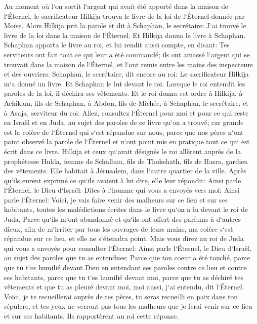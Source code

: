 \verse Au moment où l`on sortit l`argent qui avait été apporté dans la maison de l`Éternel, le sacrificateur Hilkija trouva le livre de la loi de l`Éternel donnée par Moïse. 
\verse Alors Hilkija prit la parole et dit à Schaphan, le secrétaire: J`ai trouvé le livre de la loi dans la maison de l`Éternel. Et Hilkija donna le livre à Schaphan. 
\verse Schaphan apporta le livre au roi, et lui rendit aussi compte, en disant: Tes serviteurs ont fait tout ce qui leur a été commandé; 
\verse ils ont amassé l`argent qui se trouvait dans la maison de l`Éternel, et l`ont remis entre les mains des inspecteurs et des ouvriers. 
\verse Schaphan, le secrétaire, dit encore au roi: Le sacrificateur Hilkija m`a donné un livre. Et Schaphan le lut devant le roi. 
\verse Lorsque le roi entendit les paroles de la loi, il déchira ses vêtements. 
\verse Et le roi donna cet ordre à Hilkija, à Achikam, fils de Schaphan, à Abdon, fils de Michée, à Schaphan, le secrétaire, et à Asaja, serviteur du roi: 
\verse Allez, consultez l`Éternel pour moi et pour ce qui reste en Israël et en Juda, au sujet des paroles de ce livre qu`on a trouvé; car grande est la colère de l`Éternel qui s`est répandue sur nous, parce que nos pères n`ont point observé la parole de l`Éternel et n`ont point mis en pratique tout ce qui est écrit dans ce livre. 
\verse Hilkija et ceux qu`avait désignés le roi allèrent auprès de la prophétesse Hulda, femme de Schallum, fils de Thokehath, fils de Hasra, gardien des vêtements. Elle habitait à Jérusalem, dans l`autre quartier de la ville. Après qu`ils eurent exprimé ce qu`ils avaient à lui dire, 
\verse elle leur répondit: Ainsi parle l`Éternel, le Dieu d`Israël: Dites à l`homme qui vous a envoyés vers moi: 
\verse Ainsi parle l`Éternel: Voici, je vais faire venir des malheurs sur ce lieu et sur ses habitants, toutes les malédictions écrites dans le livre qu`on a lu devant le roi de Juda. 
\verse Parce qu`ils m`ont abandonné et qu`ils ont offert des parfums à d`autres dieux, afin de m`irriter par tous les ouvrages de leurs mains, ma colère s`est répandue sur ce lieu, et elle ne s`éteindra point. 
\verse Mais vous direz au roi de Juda qui vous a envoyés pour consulter l`Éternel: Ainsi parle l`Éternel, le Dieu d`Israël, au sujet des paroles que tu as entendues: 
\verse Parce que ton coeur a été touché, parce que tu t`es humilié devant Dieu en entendant ses paroles contre ce lieu et contre ses habitants, parce que tu t`es humilié devant moi, parce que tu as déchiré tes vêtements et que tu as pleuré devant moi, moi aussi, j`ai entendu, dit l`Éternel. 
\verse Voici, je te recueillerai auprès de tes pères, tu seras recueilli en paix dans ton sépulcre, et tes yeux ne verront pas tous les malheurs que je ferai venir sur ce lieu et sur ses habitants. Ils rapportèrent au roi cette réponse. 
